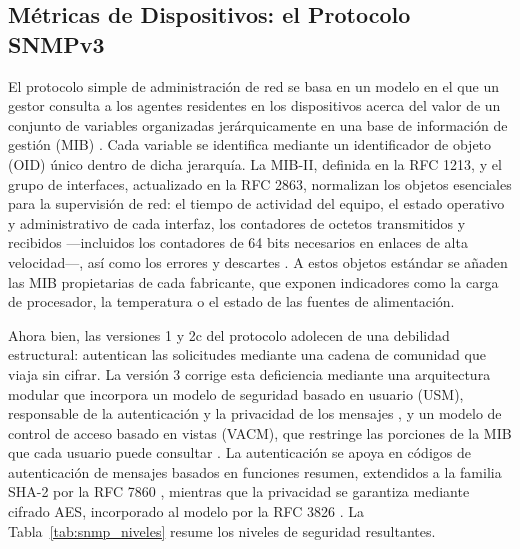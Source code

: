 \subsection{Métricas de Dispositivos: el Protocolo SNMPv3}

El protocolo simple de administración de red se basa en un modelo en el que un gestor consulta a los agentes residentes en los dispositivos acerca del valor de un conjunto de variables organizadas jerárquicamente en una base de información de gestión (MIB) \cite{kurose2021computer, stallings1999snmp}. Cada variable se identifica mediante un identificador de objeto (OID) único dentro de dicha jerarquía. La MIB-II, definida en la RFC 1213, y el grupo de interfaces, actualizado en la RFC 2863, normalizan los objetos esenciales para la supervisión de red: el tiempo de actividad del equipo, el estado operativo y administrativo de cada interfaz, los contadores de octetos transmitidos y recibidos ---incluidos los contadores de 64 bits necesarios en enlaces de alta velocidad---, así como los errores y descartes \cite{mccloghrie1991mib2, mccloghrie2000ifmib}. A estos objetos estándar se añaden las MIB propietarias de cada fabricante, que exponen indicadores como la carga de procesador, la temperatura o el estado de las fuentes de alimentación.

Ahora bien, las versiones 1 y 2c del protocolo adolecen de una debilidad estructural: autentican las solicitudes mediante una cadena de comunidad que viaja sin cifrar. La versión 3 corrige esta deficiencia mediante una arquitectura modular \cite{harrington2002architecture} que incorpora un modelo de seguridad basado en usuario (USM), responsable de la autenticación y la privacidad de los mensajes \cite{blumenthal2002user}, y un modelo de control de acceso basado en vistas (VACM), que restringe las porciones de la MIB que cada usuario puede consultar \cite{wijnen2002vacm}. La autenticación se apoya en códigos de autenticación de mensajes basados en funciones resumen, extendidos a la familia SHA-2 por la RFC 7860 \cite{merkle2016hmacsha2}, mientras que la privacidad se garantiza mediante cifrado AES, incorporado al modelo por la RFC 3826 \cite{blumenthal2004aes}. La Tabla~\ref{tab:snmp_niveles} resume los niveles de seguridad resultantes.

